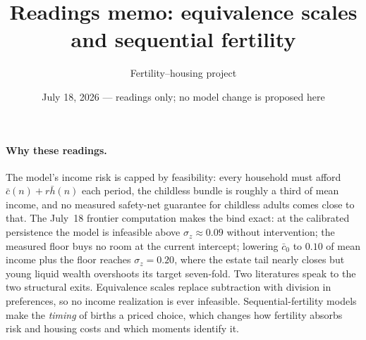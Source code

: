 \documentclass[10pt]{article}
\title{\vspace{-1.2em}\large\textbf{Readings memo: equivalence scales and sequential fertility}\vspace{-0.6em}}
\author{\normalsize Fertility--housing project}
\date{\normalsize July 18, 2026 --- readings only; no model change is proposed here}
\begin{document}
\maketitle
\vspace{-1.6em}

\paragraph{Why these readings.}
The model's income risk is capped by feasibility: every household must afford
$\bar c(n) + r\bar h(n)$ each period, the childless bundle is roughly a third
of mean income, and no measured safety-net guarantee for childless adults
comes close to that. The July~18 frontier computation makes the bind exact:
at the calibrated persistence the model is infeasible above
$\sigma_z\!\approx\!0.09$ without intervention; the measured floor buys no
room at the current intercept; lowering $\bar c_0$ to $0.10$ of mean income
plus the floor reaches $\sigma_z=0.20$, where the estate tail nearly closes
but young liquid wealth overshoots its target seven-fold. Two literatures
speak to the two structural exits. Equivalence scales replace subtraction
with division in preferences, so no income realization is ever infeasible.
Sequential-fertility models make the \emph{timing} of births a priced choice,
which changes how fertility absorbs risk and housing costs and which moments
identify it.
\end{document}
